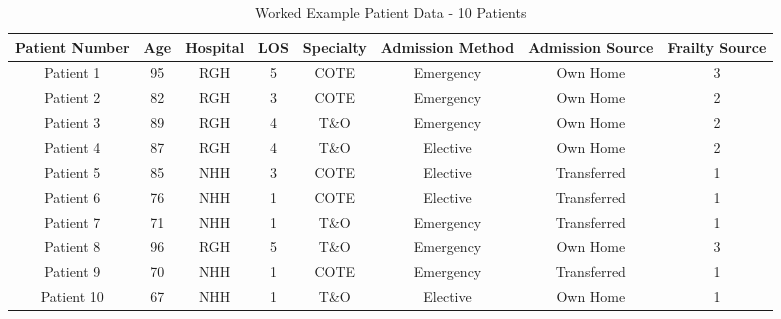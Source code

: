 \documentclass[../thesis.tex]{subfiles}
\begin{document}
\begin{table}[h!]
    \centering
    \begin{adjustbox}{width=\columnwidth}
    \begin{tabular}{cccccccc}\toprule
       \textbf{Patient Number}  & \textbf{Age} & \textbf{Hospital} & \textbf{LOS} & \textbf{Specialty} &\textbf{Admission Method} & \textbf{Admission Source} & \textbf{Frailty Source} \\\midrule
        Patient 1 & 95 & RGH & 5 & COTE & Emergency & Own Home & 3 \\ 
        Patient 2 & 82 & RGH & 3 & COTE & Emergency & Own Home & 2 \\
        Patient 3 & 89 & RGH & 4& T\&O & Emergency & Own Home & 2 \\
        Patient 4 & 87 & RGH & 4 & T\&O & Elective & Own Home & 2 \\
        Patient 5 & 85 & NHH & 3 & COTE & Elective & Transferred & 1 \\
        Patient 6 & 76 & NHH & 1 & COTE & Elective & Transferred & 1\\
        Patient 7 & 71 & NHH & 1 & T\&O & Emergency & Transferred & 1 \\
        Patient 8 & 96 & RGH & 5 & T\&O & Emergency & Own Home & 3 \\
        Patient 9 & 70 & NHH & 1 & COTE & Emergency & Transferred & 1\\
        Patient 10 & 67 & NHH & 1 & T\&O & Elective & Own Home & 1\\\bottomrule
    \end{tabular}
    \end{adjustbox}
    \caption{Worked Example Patient Data - 10 Patients}
    \label{tab:WEtable}
\end{table}
\end{document}
